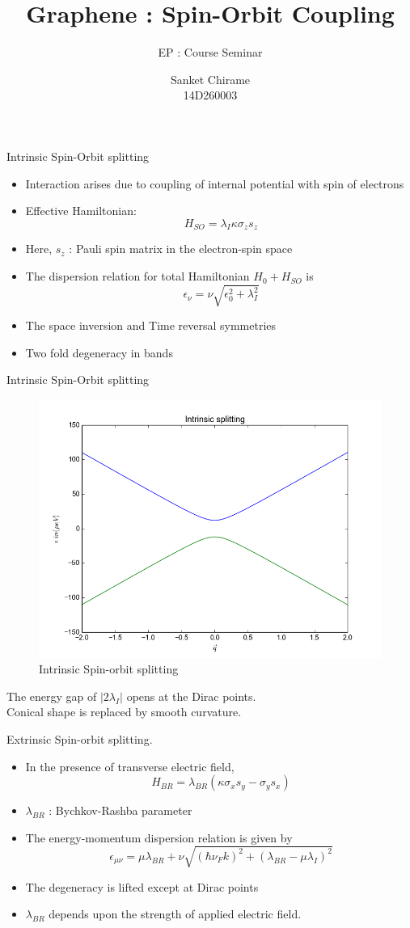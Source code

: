 \documentclass[11pt]{beamer}
\title{\textbf{Graphene : Spin-Orbit Coupling}}
\subtitle{EP  : Course Seminar}
\author[Sanket Chirame]{Sanket Chirame \\ 14D260003}
\begin{document}
\begin{frame}
  \titlepage 
\end{frame}
\begin{frame}{Intrinsic Spin-Orbit splitting}
\begin{itemize}
    \item Interaction arises due to coupling of internal potential with spin of electrons
    \item Effective Hamiltonian:
    \[\ H_{SO} = \lambda_I \kappa\sigma_zs_z \]
    \item Here, $s_z$  : Pauli spin matrix in the electron-spin space
    \item The dispersion relation for total Hamiltonian $H_0+H_{SO}$ is
    \[\ \epsilon_\nu = \nu\sqrt{\epsilon_0^2+\lambda_I^2} \]
    \item The space inversion and Time reversal symmetries
    \item Two fold degeneracy in bands
\end{itemize}
\end{frame}
\begin{frame}{Intrinsic Spin-Orbit splitting}
\begin{figure}[h]
    \includegraphics[height=0.3\textwidth,width = .5\textwidth]{figure_1}
    \caption{Intrinsic Spin-orbit splitting}
\end{figure}
The energy gap of $|2\lambda_I|$ opens at the Dirac points.\\
Conical shape is replaced by smooth curvature.
\end{frame}
\begin{frame}{Extrinsic Spin-orbit splitting}.
\begin{itemize}
    \item In the presence of transverse electric field,
\[\ H_{BR} = \lambda_{BR}(\kappa\sigma_xs_y -\sigma_ys_x ) \]
    \item $\lambda_{BR}$ : Bychkov-Rashba parameter
    \item The energy-momentum dispersion relation is given by
    \[\ \epsilon_{\mu\nu} = \mu\lambda_{BR} + \nu\sqrt{(\hbar\nu_Fk)^2 + (\lambda_{BR} - \mu\lambda_I)^2} \]
    \item The degeneracy is lifted except at Dirac points
    \item $\lambda_{BR}$ depends upon the strength of applied electric field.
\end{itemize}
\end{frame}
\end{document}
